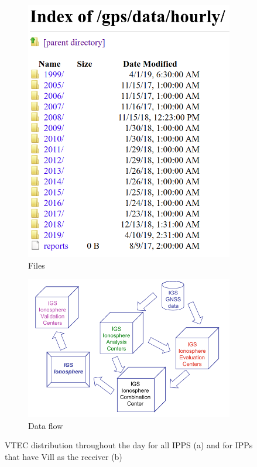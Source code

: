 \begin{figure}[!htb]
	\begin{subfigure}[b]{0.3\textwidth}
		\includegraphics[width=\linewidth]{images/ch4/FTPNASA.png}
		\caption{Files}
	\end{subfigure}
	\hfill
	\begin{subfigure}[b]{0.5\textwidth}
		\includegraphics[width=\linewidth]{images/ch4/DataFlowIGS.png}
		\caption{Data flow}
	\end{subfigure}
	\caption{VTEC distribution throughout the day for all IPPS (a) and for IPPs that have Vill as the receiver (b)}
	\label{fig:exampleCDDIS}
\end{figure}

